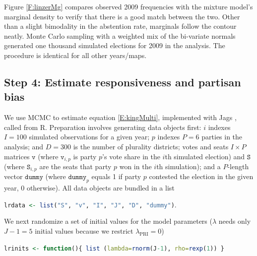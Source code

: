 \documentclass[letter,12pt]{article}
\begin{document}
Figure \ref{F:linzerMg} compares observed 2009 frequencies with the mixture model's marginal density to verify that there is a good match between the two. Other than a slight bimodality in the abstention rate, marginals follow the contour neatly. Monte Carlo sampling with a weighted mix of the bi-variate normals generated one thousand simulated elections for 2009 in the analysis. The procedure is identical for all other years/maps. 


\subsection*{Step 4: Estimate responsiveness and partisan bias}

We use MCMC to estimate equation \ref{E:kingMulti}, implemented with Jags \citep{jags.cite}, called from R. Preparation involves generating data objects first: $i$ indexes $I=100$ simulated observations for a given year; $p$ indexes $P=6$ parties in the analysis; and $D=300$ is the number of plurality districts; votes and seats $I\times P$ matrices $\texttt{v}$ (where $\texttt{v}_{i,p}$ is party $p$'s vote share in the $i$th simulated election) and $\texttt{S}$ (where $\texttt{S}_{i,p}$ are the seats that party $p$ won in the $i$th simulation); and a $P$-length vector $\texttt{dummy}$ (where $\texttt{dummy}_p$ equals 1 if party $p$ contested the election in the given year, 0 otherwise). All data objects are bundled in a list 

\begin{center}
\lstinline[language=R]!lrdata <- list("S", "v", "I", "J", "D", "dummy")!.
\end{center}

\noindent We next randomize a set of initial values for the model parameters ($\lambda$ needs only $J-1=5$ initial values because we restrict $\lambda_{\text{PRI}}=0$)

\begin{center}
\lstinline[language=R]!lrinits <- function(){ list (lambda=rnorm(J-1), rho=rexp(1)) }!
\end{center}
\end{document}
